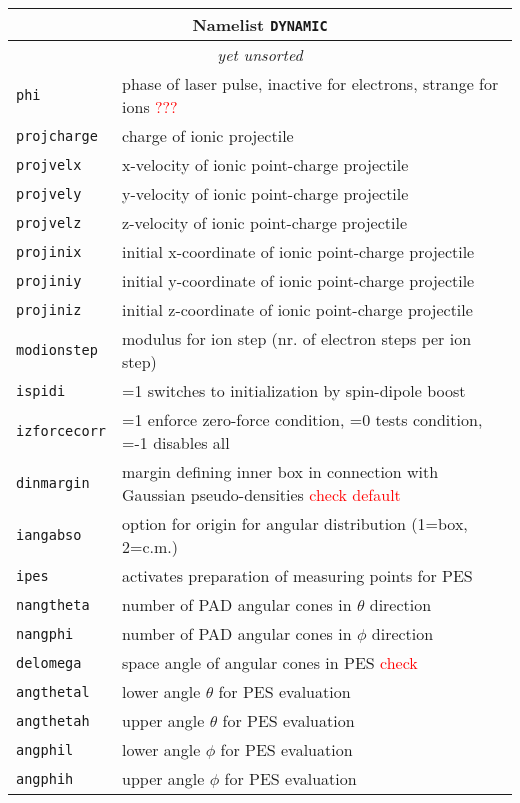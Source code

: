 \documentclass[12pt]{article}
\begin{document}
\begin{tabular}{ll}
\hline
\multicolumn{2}{c}{Namelist {\tt DYNAMIC}} in {\tt for005.<name>} \\
\hline
\multicolumn{2}{c}{\it yet unsorted} \\
\hline
{\tt phi} & phase of laser pulse, inactive for electrons, strange
for ions \textcolor{red}{???} \\
{\tt projcharge} &  charge of ionic projectile \\
{\tt projvelx} &  x-velocity of ionic point-charge  projectile\\
{\tt projvely} &  y-velocity of ionic point-charge  projectile  \\
{\tt projvelz} &  z-velocity of ionic point-charge  projectile  \\
{\tt projinix} &  initial x-coordinate of ionic point-charge projectile  \\
{\tt projiniy} &  initial y-coordinate of ionic point-charge  projectile  \\
{\tt projiniz} &  initial z-coordinate of ionic point-charge  projectile  \\
{\tt modionstep} & modulus for ion step (nr. of electron steps per ion
step)\\
{\tt ispidi} & =1  switches to initialization by spin-dipole boost\\
{\tt izforcecorr} & =1 enforce zero-force condition, =0 tests
condition, =-1 disables all  \\
{\tt dinmargin} & margin defining inner box in connection with
Gaussian pseudo-densities \textcolor{red}{check default}\\
{\tt iangabso} & option for origin for angular distribution (1=box,
2=c.m.) \\
{\tt ipes} & activates preparation of measuring points for PES \\
{\tt nangtheta} & number of PAD angular cones in $\theta$ direction \\
{\tt nangphi} &  number of PAD angular cones in $\phi$ direction \\
{\tt delomega} &  space angle of angular cones in PES \textcolor{red}{check}\\
{\tt angthetal} & lower angle  $\theta$ for PES evaluation \\
{\tt angthetah} & upper angle  $\theta$ for PES evaluation  \\
{\tt angphil} &  lower angle  $\phi$ for PES evaluation \\
{\tt angphih} &  upper angle  $\phi$ for PES evaluation \\

\end{tabular}
\end{document}
